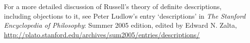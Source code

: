 For a more detailed discussion of Russell's theory of definite descriptions, including objections to it, see Peter Ludlow's entry `descriptions' in \emph{The Stanford Encyclopedia of Philosophy}: Summer 2005 edition, edited by Edward N. Zalta, \url{http://plato.stanford.edu/archives/sum2005/entries/descriptions/}


\practiceproblems






